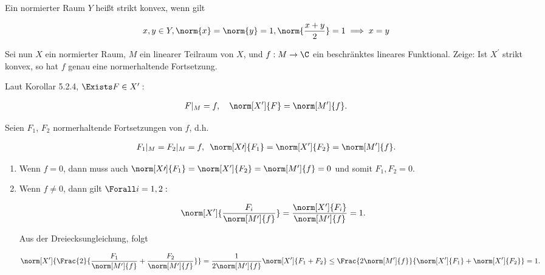 \begin{exercise}

Ein normierter Raum $Y$ heißt strikt konvex, wenn gilt

\begin{align*}
  x, y \in Y,
  \norm{x} = \norm{y} = 1,
  \norm{\frac{x+y}{2}} = 1
  \implies
  x = y
\end{align*}

Sei nun $X$ ein normierter Raum, $M$ ein linearer Teilraum von $X$, und $f: M \to \C$ ein beschränktes lineares Funktional.
Zeige:
Ist $X^\prime$ strikt konvex, so hat $f$ genau eine normerhaltende Fortsetzung.

\end{exercise}

\begin{solution}

Laut Korollar 5.2.4, $\Exists F \in X^\prime:$

\begin{align*}
  F|_M = f,
  \quad
  \norm[X^\prime]{F} = \norm[M^\prime]{f}.
\end{align*}

Seien $F_1$, $F_2$ normerhaltende Fortsetzungen von $f$, d.h.

\begin{align*}
  F_1|_M = F_2|_M = f,
  \enspace
  \norm[X\prime]{F_1} = \norm[X^\prime]{F_2} = \norm[M^\prime]{f}.
\end{align*}

\begin{enumerate}[label = Fall \arabic*:]

  \item
  Wenn $f = 0$, dann muss auch $\norm[X\prime]{F_1} = \norm[X^\prime]{F_2} = \norm[M^\prime]{f} = 0$ und somit $F_1, F_2 = 0$.

  \item
  Wenn $f \neq 0$, dann gilt $\Forall i = 1, 2:$

  \begin{align*}
    \norm[X^\prime]{\frac{F_i}{\norm[M^\prime]{f}}}
    =
    \frac{\norm[X^\prime]{F_i}}{\norm[M^\prime]{f}} = 1.
  \end{align*}

  Aus der Dreiecksungleichung, folgt

  \begin{align*}
    \norm[X^\prime]
    {
      \Frac{2}
      {
        \frac{F_1}{\norm[M^\prime]{f}} +
        \frac{F_2}{\norm[M^\prime]{f}}
      }
    }
    =
    \frac{1}{2 \norm[M^\prime]{f}} \norm[X^\prime]{F_1 + F_2}
    \leq
    \Frac{2 \norm[M^\prime]{f}}
    {
      \norm[X^\prime]{F_1} +
      \norm[X^\prime]{F_2}
    }
    = 1.
  \end{align*}


\end{enumerate}
\end{solution}
